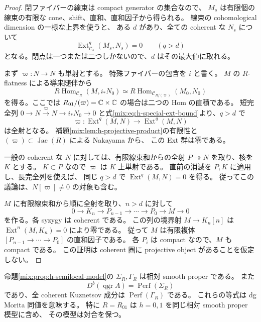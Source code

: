 \begin{proof}
閉ファイバーの線束は compact generator の集合なので、
$M_s$ は有限個の線束の有限な cone、shift、直和、直和因子から得られる。
線束の cohomological dimension の一様な上界を使うと、
ある $d$ があり、全ての coherent な $N_s$ について
\begin{equation}\label{mix:eq:h-special-ext-bound}
 \operatorname{Ext}^q_{\mathcal C_s}(M_s,N_s)=0
 \qquad(q>d)
\end{equation}
となる。閉点は一つまたは二つしかないので、$d$ はその最大値に取れる。

まず $\varpi:N\to N$ も単射とする。
特殊ファイバーの包含を $i$ と書く。
$M$ の $R$-flatness による導来随伴から
\[
 R\operatorname{Hom}_{\mathcal C_R}(M,i_*N_0)
 \simeq R\operatorname{Hom}_{\mathcal C_{R/(\varpi)}}(M_0,N_0)
\]
を得る。ここでは $R_{01}/(\varpi)=\mathbb C\times\mathbb C$ の場合は二つの Hom の直積である。
短完全列
$0\to N\xrightarrow{\varpi}N\to i_*N_0\to0$
と式\eqref{mix:eq:h-special-ext-bound}より、$q>d$ で
\[
 \varpi:\operatorname{Ext}^q(M,N)\longrightarrow
                   \operatorname{Ext}^q(M,N)
\]
は全射となる。
補題\ref{mix:lem:h-projective-product}の有限性と
$(\varpi)\subset\operatorname{Jac}(R)$ による Nakayama から、
この Ext 群は零である。

一般の coherent な $N$ に対しては、有限線束和からの全射
$P\twoheadrightarrow N$ を取り、核を $K$ とする。
$K\subset P$ なので $\varpi$ は $K$ 上単射である。
直前の消滅を $P,K$ に適用し、長完全列を使えば、
同じ $q>d$ で $\operatorname{Ext}^q(M,N)=0$ を得る。
従ってこの議論は、$N[\varpi]\ne0$ の対象も含む。

$M$ に有限線束和から順に全射を取り、$n>d$ に対して
\[
 0\longrightarrow K_n\longrightarrow P_{n-1}\longrightarrow\cdots
 \longrightarrow P_0\longrightarrow M\longrightarrow0
\]
を作る。各 syzygy は coherent である。
この列の境界射 $M\to K_n[n]$ は
$\operatorname{Ext}^n(M,K_n)=0$ により零である。
従って $M$ は有限複体
$[P_{n-1}\to\cdots\to P_0]$ の直和因子である。
各 $P_i$ は compact なので、$M$ も compact である。
この証明は coherent 圏に projective object があることを仮定しない。
\end{proof}

\begin{theorem}
\label{mix:thm:h-semilocal-smooth}
命題\ref{mix:prop:h-semilocal-model}の $\Sigma_R,\Gamma_R$ は相対 smooth proper である。
また
\[
 D^b(\operatorname{qgr}A)=\operatorname{Perf}(\Sigma_R)
\]
であり、全 coherent Kuznetsov 成分は $\operatorname{Perf}(\Gamma_R)$ である。
これらの等式は dg Morita 同値を意味する。
特に $R=R_{01}$ は $h=0,1$ を同じ相対 smooth proper 模型に含め、
その模型は対合を保つ。
\end{theorem}

